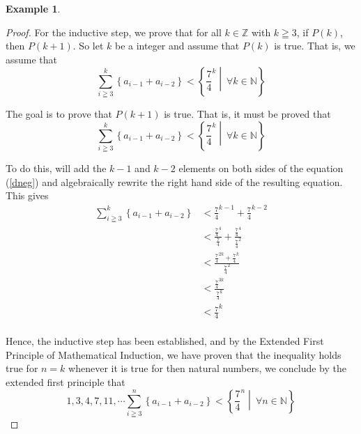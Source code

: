 \documentclass{book}
\theoremstyle{definition}
\newtheorem{example}[theorem]{Example}
\begin{document}
\begin{example}
\begin{proof}
        For the inductive step, we prove that for all $k \in \mathbb{Z}$ with $k \geqq 3$, if $P(k)$, then $P(k+1)$. So let $k$ be a integer and assume that $P(k)$ is true. That is, we assume that 
            \begin{equation*}
               \sum_{i \geqq 3}^{k}{ \left  \{ a_{i-1} + a_{i-2} \right \}}  < \left \{ \frac{7}{4}^{k} \middle |\ \forall k \in \mathbb{N} \right \}
            \end{equation*}
        
        The goal is to prove that $P(k+1)$ is true. That is, it must be proved that  
            \begin{equation}
            \label{dneg}
                \sum_{i \geqq 3}^{k}{ \left  \{ a_{i-1} + a_{i-2} \right \}}  < \left \{ \frac{7}{4}^{k} \middle |\ \forall k \in \mathbb{N} \right \}
            \end{equation}
        
        To do this, will add the $k-1$ and $k-2$ elements on both sides of the equation (\ref{dneg}) and algebraically rewrite the right hand side of the resulting equation. This gives
            \begin{align*}
                \sum_{i \geqq 3}^{k}{ \left  \{ a_{i-1} + a_{i-2} \right \}} & < \frac{7}{4}^{k-1} + \frac{7}{4}^{k-2} \\
                    & < \frac{{\frac{7}{4}}^4}{\frac{7}{4}} + \frac{{\frac{7}{4}}^4}{{\frac{7}{4}}^2} \\
                    & < \frac{{\frac{7}{4}}^{2k} + {\frac{7}{4}}^k}{{\frac{7}{4}}^2} \\
                    & < \frac{{\frac{7}{4}}^{3k}}{{\frac{7}{4}}^k} \\
                    & < {\frac{7}{4}}^k \\
            \end{align*}
        
        Hence, the inductive step has been established, and by the Extended First Principle of Mathematical Induction, we have proven that the inequality holds true for $n=k$ whenever it is true for then natural numbers, we conclude by the extended first principle that
            \begin{equation*}
                1,3,4,7,11, \cdots \sum_{i \geqq 3}^{n}{ \left  \{ a_{i-1} + a_{i-2} \right \}}  < \left \{ \frac{7}{4}^{n} \middle |\ \forall n \in \mathbb{N} \right \}
            \end{equation*}
\end{proof}
\end{example}
\end{document}
